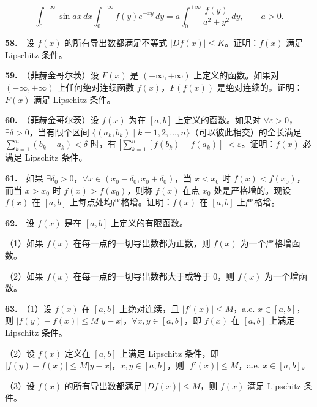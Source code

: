 \documentclass[11pt,a4paper]{article}
\begin{document}
\[
\int_0^{+\infty}\sin ax\,dx\int_0^{+\infty}f(y)e^{-xy}\,dy=a\int_0^{+\infty}\frac{f(y)}{a^2+y^2}\,dy,\qquad a>0.
\]

\par{}\hypertarget{review58}{}\noindent \textbf{58.}　设 \(f(x)\) 的所有导出数都满足不等式 \(|Df(x)|\le K\)。证明：\(f(x)\) 满足 Lipschitz 条件。

\par{}\hypertarget{review59}{}\noindent \textbf{59.}　（菲赫金哥尔茨）设 \(F(x)\) 是 \((-\infty,+\infty)\) 上定义的函数。如果对 \((-\infty,+\infty)\) 上任何绝对连续函数 \(f(x)\)，\(F(f(x))\) 是绝对连续的。证明：\(F(x)\) 满足 Lipschitz 条件。

\par{}\hypertarget{review60}{}\noindent \textbf{60.}　（菲赫金哥尔茨）设 \(f(x)\) 为在 \([a,b]\) 上定义的函数。如果对 \(\forall\varepsilon>0\)，\(\exists\delta>0\)，当有限个区间 \(\{(a_k,b_k)\mid k=1,2,\ldots,n\}\)（可以彼此相交）的全长满足 \(\sum_{k=1}^n(b_k-a_k)<\delta\) 时，有 \(|\sum_{k=1}^n[f(b_k)-f(a_k)]|<\varepsilon\)。证明：\(f(x)\) 必满足 Lipschitz 条件。

\par{}\hypertarget{review61}{}\noindent \textbf{61.}　如果 \(\exists\delta_0>0\)，\(\forall x\in(x_0-\delta_0,x_0+\delta_0)\)，当 \(x<x_0\) 时 \(f(x)<f(x_0)\)，而当 \(x>x_0\) 时 \(f(x)>f(x_0)\)，则称 \(f(x)\) 在点 \(x_0\) 处是严格增的。现设 \(f(x)\) 在 \([a,b]\) 上每点处均严格增。证明：\(f(x)\) 在 \([a,b]\) 上严格增。

\par{}\hypertarget{review62}{}\noindent \textbf{62.}　设 \(f(x)\) 是在 \([a,b]\) 上定义的有限函数。

（1）如果 \(f(x)\) 在每一点的一切导出数都为正数，则 \(f(x)\) 为一个严格增函数。

（2）如果 \(f(x)\) 在每一点的一切导出数都大于或等于 \(0\)，则 \(f(x)\) 为一个增函数。

\par{}\hypertarget{review63}{}\noindent \textbf{63.}　（1）设 \(f(x)\) 在 \([a,b]\) 上绝对连续，且 \(|f'(x)|\le M\)，a.e. \(x\in[a,b]\)，则 \(|f(y)-f(x)|\le M|y-x|\)，\(\forall x,y\in[a,b]\)，即 \(f(x)\) 在 \([a,b]\) 上满足 Lipschitz 条件。

（2）设 \(f(x)\) 定义在 \([a,b]\) 上满足 Lipschitz 条件，即 \(|f(y)-f(x)|\le M|y-x|\)，\(x,y\in[a,b]\)，则 \(|f'(x)|\le M\)，a.e. \(x\in[a,b]\)。

（3）设 \(f(x)\) 的所有导出数都满足 \(|Df(x)|\le M\)，则 \(f(x)\) 满足 Lipschitz 条件。
\end{document}
